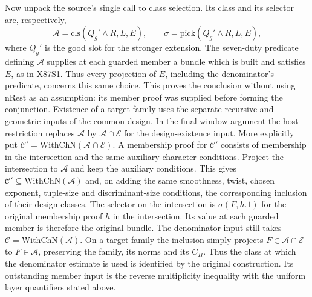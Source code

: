 Now unpack the source's single call to class selection. Its class
and its selector are, respectively,
\[
    \mathcal A=\mathrm{cls}(Q_g'\wedge R,L,E),\qquad
    \sigma=\mathrm{pick}(Q_g'\wedge R,L,E),
\]
where $Q_g'$ is the good slot for the stronger extension.
The seven-duty predicate defining $\mathcal A$ supplies at each
guarded member a bundle which is built and satisfies $E$, as in
X87S1. Thus every projection of $E$, including the denominator's
predicate, concerns this same choice. This proves the conclusion
without using $\mathrm{nRest}$ as an assumption: its member proof
was supplied before forming the conjunction. Existence of a
target family uses the separate recursive and geometric inputs of
the common design. In the final window argument the host restriction
replaces $\mathcal A$ by $\mathcal A\cap\mathcal E$ for the
design-existence input. More explicitly put $\mathcal C'=\mathrm{WithChN}(\mathcal A\cap\mathcal E)$. A membership proof for $\mathcal C'$ consists of membership in the intersection and the same auxiliary character conditions. Project the intersection to $\mathcal A$ and keep the auxiliary conditions. This gives $\mathcal C'\subseteq\mathrm{WithChN}(\mathcal A)$ and, on adding the same smoothness, twist, chosen exponent, tuple-size and discriminant-size conditions, the corresponding inclusion of their design classes. The selector on the intersection is $\sigma(F,h.1)$ for the original membership proof $h$ in the intersection. Its value at each guarded member is therefore the original bundle. The denominator input still takes
$\mathcal C=\mathrm{WithChN}(\mathcal A)$. On a target family the
inclusion simply projects $F\in\mathcal A\cap\mathcal E$ to
$F\in\mathcal A$, preserving the family, its norms and its
$C_H$. Thus the class at which the denominator estimate is used
is identified by the original construction. Its outstanding
member input is the reverse multiplicity inequality with the
uniform layer quantifiers stated above.
